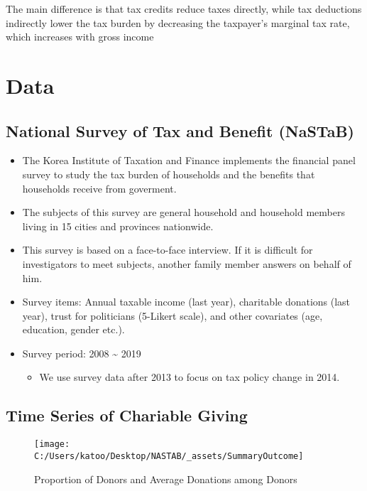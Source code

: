 \documentclass[ review  , 3p ]{elsarticle}
\providecommand{\tightlist}{%
  \setlength{\itemsep}{0pt}\setlength{\parskip}{0pt}}
\begin{document}
  The main difference is that tax credits reduce taxes directly, while tax deductions indirectly lower the tax burden by decreasing the taxpayer's marginal tax rate, which increases with gross income

  \hypertarget{data}{%
  \section{Data}\label{data}}

  \hypertarget{national-survey-of-tax-and-benefit-nastab}{%
  \subsection{National Survey of Tax and Benefit (NaSTaB)}\label{national-survey-of-tax-and-benefit-nastab}}

  \begin{itemize}
  \tightlist
  \item
    The Korea Institute of Taxation and Finance implements the financial panel survey to study the tax burden of households and the benefits that households receive from goverment.
  \item
    The subjects of this survey are general household and household members living in 15 cities and provinces nationwide.
  \item
    This survey is based on a face-to-face interview. If it is difficult for investigators to meet subjects, another family member answers on behalf of him.
  \item
    Survey items: Annual taxable income (last year), charitable donations (last year), trust for politicians (5-Likert scale), and other covariates (age, education, gender etc.).
  \item
    Survey period: 2008 \textasciitilde{} 2019

    \begin{itemize}
    \tightlist
    \item
      We use survey data after 2013 to focus on tax policy change in 2014.
    \end{itemize}
  \end{itemize}

  \hypertarget{time-series-of-chariable-giving}{%
  \subsection{Time Series of Chariable Giving}\label{time-series-of-chariable-giving}}

  \begin{figure}

  {\centering \texttt{[image: C:/Users/katoo/Desktop/NASTAB/\_assets/SummaryOutcome]} 

  }

  \caption{Proportion of Donors and Average Donations among Donors}\label{fig:unnamed-chunk-1}
  \end{figure}
\end{document}
